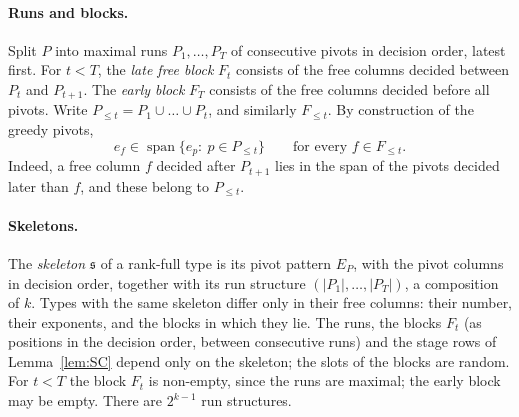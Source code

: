 \paragraph{Runs and blocks.}
Split $P$ into maximal runs $P_1,\dots,P_T$ of consecutive pivots in decision order, latest first. For $t<T$, the
\emph{late free block} $F_t$ consists of the free columns decided between $P_t$ and $P_{t+1}$. The \emph{early block}
$F_T$ consists of the free columns decided before all pivots. Write $P_{\le t}=P_1\cup\dots\cup P_t$, and similarly
$F_{\le t}$. By construction of the greedy pivots,
\begin{equation}\label{eq:A-span}
  e_f\in\operatorname{span}\{e_p:\ p\in P_{\le t}\}\qquad\text{for every }f\in F_{\le t}.
\end{equation}
Indeed, a free column $f$ decided after $P_{t+1}$ lies in the span of the pivots decided later than $f$, and these
belong to $P_{\le t}$.

\paragraph{Skeletons.}
The \emph{skeleton} $\mathfrak s$ of a rank-full type is its pivot pattern $E_P$, with the pivot columns in decision
order, together with its run structure $(|P_1|,\dots,|P_T|)$, a composition of $k$. Types with the same skeleton differ
only in their free columns: their number, their exponents, and the blocks in which they lie. The runs, the blocks
$F_t$ (as positions in the decision order, between consecutive runs) and the stage rows of Lemma~\ref{lem:SC} depend only on the skeleton; the slots of the blocks are random. For $t<T$ the block $F_t$ is non-empty, since the runs are maximal; the early block may be
empty. There are $2^{k-1}$ run structures.

